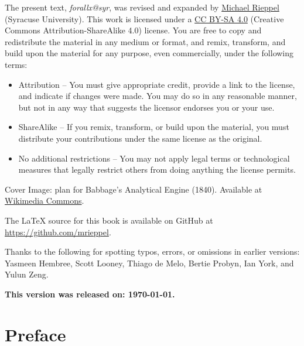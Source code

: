 \vspace{1ex}

\noindent The present text, \emph{forallx@syr}, was revised and expanded by \href{https://mrieppel.net/}{Michael Rieppel} (Syracuse University).  This work is licensed under a \href{https://creativecommons.org/licenses/by-sa/4.0/}{CC BY-SA 4.0} (Creative Commons Attribution-ShareAlike 4.0) license.  You are free to copy and redistribute the material in any medium or format, and  remix, transform, and build upon the material for any purpose, even commercially, under the following terms:
\begin{itemize}
\item Attribution -- You must give appropriate credit, provide a link to the license, and indicate if changes were made. You may do so in any reasonable manner, but not in any way that suggests the licensor endorses you or your use.

\item ShareAlike -- If you remix, transform, or build upon the material, you must distribute your contributions under the same license as the original.

\item No additional restrictions -- You may not apply legal terms or technological measures that legally restrict others from doing anything the license permits.
\end{itemize}

\vspace{1ex}
\noindent Cover Image: plan for Babbage's Analytical Engine (1840). Available at \href{https://commons.wikimedia.org/wiki/File:Babbage_Analytical_Engine_Plan_1840_CHM.agr.jpg}{Wikimedia Commons}.

\vspace{1ex}

\noindent The \LaTeX{} source for this book is available on GitHub at \href{https://github.com/mrieppel}{https://github.com/mrieppel}. 

\vspace{1ex}
\noindent Thanks to the following for spotting typos, errors, or omissions in earlier versions: Yasmeen Hembree, Scott Looney, Thiago de Melo, Bertie Probyn, Ian York, and Yulun Zeng.

\vspace{4ex}

\noindent \textbf{This version was released on: \today.}


\newpage
\normalsize
\chapter*{Preface}

